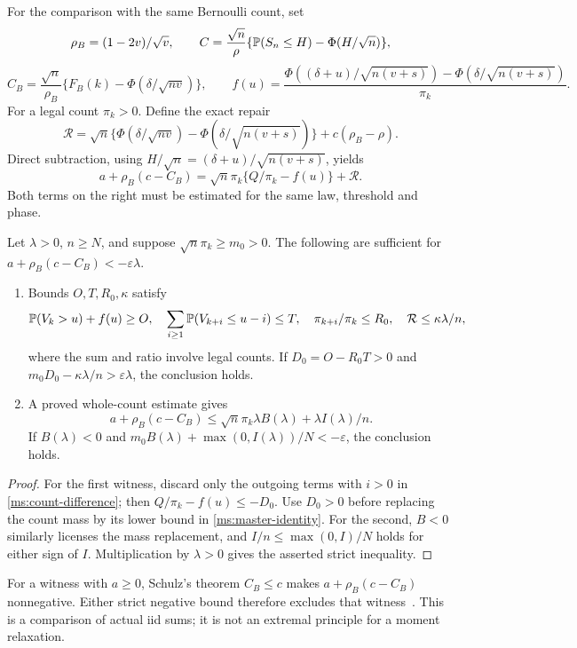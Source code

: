 For the comparison with the same Bernoulli count, set
\[
 \rho_B=(1-2v)/\sqrt v,\qquad
 C=\frac{\sqrt n}{\rho}\{\mathbb P(S_n\le H)-\Phi(H/\sqrt n)\},
\]
\[
 C_B=\frac{\sqrt n}{\rho_B}
       \{F_B(k)-\Phi(\delta/\sqrt{nv})\},
 \qquad
 f(u)=\frac{\Phi((\delta+u)/\sqrt{n(v+s)})-
                    \Phi(\delta/\sqrt{n(v+s)})}{\pi_k}.
\]
For a legal count $\pi_k>0$. Define the exact repair
\[
 \mathcal R=\sqrt n\{\Phi(\delta/\sqrt{nv})-
                    \Phi(\delta/\sqrt{n(v+s)})\}
                         +c(\rho_B-\rho).
\]
Direct subtraction, using $H/\sqrt n=(\delta+u)/\sqrt{n(v+s)}$, yields
\begin{equation}
 a+\rho_B(c-C_B)=\sqrt n\pi_k\{Q/\pi_k-f(u)\}+\mathcal R.
\label{ms:master-identity}
\end{equation}
Both terms on the right must be estimated for the same law, threshold and phase.

\begin{proposition}
\label{ms:local-witnesses}
Let $\lambda>0$, $n\ge N$, and suppose $\sqrt n\pi_k\ge m_0>0$.
The following are sufficient for $a+\rho_B(c-C_B)<-\varepsilon\lambda$.
\begin{enumerate}
\item Bounds $O,T,R_0,\kappa$ satisfy
\[
 \mathbb P(V_k>u)+f(u)\ge O,\quad
 \sum_{i\ge1}\mathbb P(V_{k+i}\le u-i)\le T,\quad
 \pi_{k+i}/\pi_k\le R_0,\quad
 \mathcal R\le\kappa\lambda/n,
\]
where the sum and ratio involve legal counts. If $D_0=O-R_0T>0$ and
$m_0D_0-\kappa\lambda/n>\varepsilon\lambda$, the conclusion holds.
\item A proved whole-count estimate gives
\[
 a+\rho_B(c-C_B)\le\sqrt n\pi_k\lambda B(\lambda)
                               +\lambda I(\lambda)/n.
\]
If $B(\lambda)<0$ and
$m_0B(\lambda)+\max(0,I(\lambda))/N<-\varepsilon$, the conclusion holds.
\end{enumerate}
\end{proposition}
\begin{proof}
For the first witness, discard only the outgoing terms with $i>0$ in
\eqref{ms:count-difference}; then $Q/\pi_k-f(u)\le-D_0$.
Use $D_0>0$ before replacing the count mass by its lower bound in
\eqref{ms:master-identity}. For the second, $B<0$ similarly licenses the
mass replacement, and $I/n\le\max(0,I)/N$ holds for either sign of $I$.
Multiplication by $\lambda>0$ gives the asserted strict inequality.
\end{proof}

For a witness with $a\ge0$, Schulz's theorem $C_B\le c$ makes
$a+\rho_B(c-C_B)$ nonnegative. Either strict negative bound therefore
excludes that witness~\cite{Schulz2016}. This is a comparison of actual
iid sums; it is not an extremal principle for a moment relaxation.

